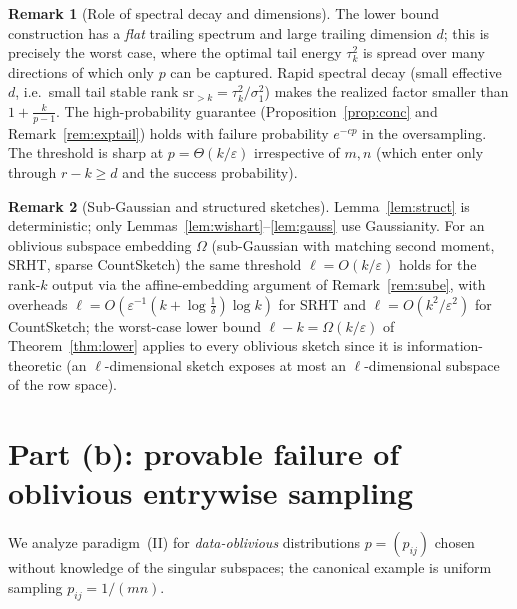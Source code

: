 \documentclass{amsart}
\theoremstyle{definition}
\newtheorem{remark}{Remark}
\begin{document}
\begin{remark}[Role of spectral decay and dimensions]
The lower bound construction has a \emph{flat} trailing spectrum and large
trailing dimension $d$; this is precisely the worst case, where the optimal
tail energy $\tau_k^2$ is spread over many directions of which only $p$ can be
captured. Rapid spectral decay (small effective $d$, i.e.\ small tail stable
rank $\mathrm{sr}_{>k}=\tau_k^2/\sigma_1^2$) makes the realized factor smaller
than $1+\tfrac{k}{p-1}$. The high-probability guarantee
(Proposition~\ref{prop:conc} and Remark~\ref{rem:exptail}) holds with failure
probability $e^{-cp}$ in the oversampling. The
threshold is sharp at $p=\Theta(k/\varepsilon)$ irrespective of $m,n$ (which
enter only through $r-k\ge d$ and the success probability).
\end{remark}

\begin{remark}[Sub-Gaussian and structured sketches]
Lemma~\ref{lem:struct} is deterministic; only Lemmas~\ref{lem:wishart}--\ref{lem:gauss}
use Gaussianity. For an oblivious subspace embedding $\Omega$ (sub-Gaussian
with matching second moment, SRHT, sparse CountSketch) the same threshold
$\ell=O(k/\varepsilon)$ holds for the rank-$k$ output via the affine-embedding
argument of Remark~\ref{rem:sube}, with overheads
$\ell=O(\varepsilon^{-1}(k+\log\tfrac1\delta)\log k)$ for SRHT and
$\ell=O(k^2/\varepsilon^2)$ for CountSketch; the worst-case lower bound
$\ell-k=\Omega(k/\varepsilon)$ of Theorem~\ref{thm:lower} applies to every
oblivious sketch since it is information-theoretic (an $\ell$-dimensional sketch
exposes at most an $\ell$-dimensional subspace of the row space).
\end{remark}

\section{Part (b): provable failure of oblivious entrywise sampling}

We analyze paradigm~(II) for \emph{data-oblivious} distributions
$p=(p_{ij})$ chosen without knowledge of the singular subspaces; the canonical
example is uniform sampling $p_{ij}=1/(mn)$.
\end{document}
